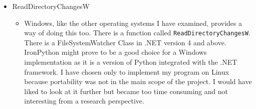 \documentclass[12pt]{article}
\begin{document}
\begin{itemize}
\begin{itemize}
        I also looked at using the \texttt{kqueue}
        \footnote{http://developer.apple.com/library/mac/\#documentation/Darwin/Reference/ManPages/man2/kqueue.2.html}
        system call that is
        supported by MacOS~X and FreeBSD. It notifies the user
        when a kernel event occurs. I decided against using
        \texttt{kqueue} as the high level approach of FSEvents
        suits my application's needs.
        \end{itemize}

    \item ReadDirectoryChangesW
        \begin{itemize}
        \item Windows, like the other operating systems
        I have examined, provides a way of doing this
        too. There is a function called \texttt{ReadDirectoryChangesW}.
        There is a FileSystemWatcher Class in .NET version 4 and
        above. IronPython might prove to be a good choice for a
        Windows implementation as it is a version of Python integrated
        with the .NET framework. I have chosen only to implement
        my program on Linux because portability was not in the main
        scope of the project. I would have liked to look
        at it further but became too time consuming and not interesting
        from a research perspective.
        \end{itemize}
\end{itemize}
\end{document}
